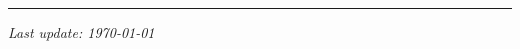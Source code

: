 \documentclass[10pt]{article}
\newcommand{\lineOa}{\hspace*{-\marginparsep minus \marginparwidth}
\begin{minipage}[t]{\textwidth+\marginparwidth+\marginparsep}
\rule{\columnwidth}{0.5pt}\end{minipage}}
\renewcommand{\section}[1]{\pagebreak[3]%
    \vspace{1.3\baselineskip}%
    \phantomsection\addcontentsline{toc}{section}{#1}%
    \noindent\llap{\scshape\smash{\parbox[t]{\marginparwidth}{\hyphenpenalty=10000\raggedright #1}}}%
    \vspace{-\baselineskip}\par}
\newcommand{\halfblankline}{\quad\vspace{-0.5\baselineskip}\pagebreak[3]}
\providecommand*\url[1]{\href{#1}{#1}}
\renewcommand*\url[1]{\href{#1}{\texttt{#1}}}
\begin{document}
\halfblankline

\lineOa

\begin{flushright}
\emph{Last update: \today}
\end{flushright}




\end{document}
